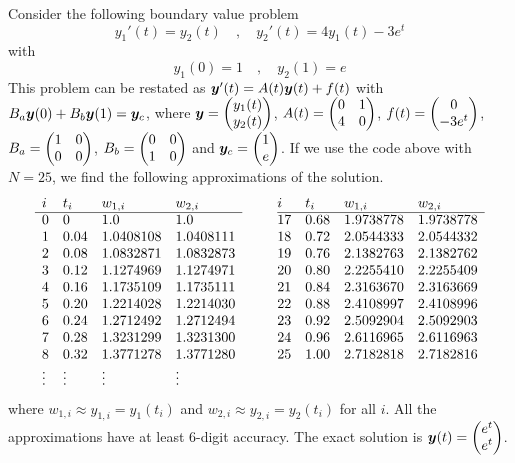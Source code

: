 \begin{egg}
Consider the following boundary value problem
\[
  y_1'(t) = y_2(t) \quad , \quad y_2'(t) = 4 y_1(t) - 3 e^t
\]
with
\[
y_1(0) = 1 \quad , \quad y_2(1) = e
\]
This problem can be restated as
$\bm{y}'(t) = A(t) \bm{y}(t) + f(t)$ with
$B_a \bm{y}(0) + B_b\bm{y}(1) = \bm{y}_c$, where
$\displaystyle \bm{y} = \begin{pmatrix} y_1(t) \\ y_2(t) \end{pmatrix}$,
$\displaystyle A(t) = \begin{pmatrix} 0 & 1 \\ 4 & 0 \end{pmatrix}$,
$\displaystyle f(t) = \begin{pmatrix} 0 \\ -3 e^t \end{pmatrix}$,
$\displaystyle B_a = \begin{pmatrix} 1 & 0 \\  0 & 0 \end{pmatrix}$,
$\displaystyle B_b = \begin{pmatrix} 0 & 0 \\ 1 & 0 \end{pmatrix}$
and $\displaystyle \bm{y}_c = \begin{pmatrix} 1 \\ e \end{pmatrix}$.
If we use the code above with $N=25$, we find the following approximations of
the solution.
\[
\begin{array}{llllc@{\hspace{2em}}llll}
i & t_i & w_{1,i} & w_{2,i} & & i & t_i & w_{1,i} & w_{2,i} \\
\cline{1-4} \cline{6-9}
0 & 0 & 1.0 & 1.0  & & 17 & 0.68 & 1.9738778 & 1.9738778 \\
1 & 0.04 & 1.0408108 & 1.0408111 & & 18 & 0.72 & 2.0544333 & 2.0544332 \\
2 & 0.08 & 1.0832871 & 1.0832873 & & 19 & 0.76 & 2.1382763 & 2.1382762 \\
3 & 0.12 & 1.1274969 & 1.1274971 & & 20 & 0.80 & 2.2255410 & 2.2255409 \\
4 & 0.16 & 1.1735109 & 1.1735111 & & 21 & 0.84 & 2.3163670 & 2.3163669 \\
5 & 0.20 & 1.2214028 & 1.2214030 & & 22 & 0.88 & 2.4108997 & 2.4108996 \\
6 & 0.24 & 1.2712492 & 1.2712494 & & 23 & 0.92 & 2.5092904 & 2.5092903 \\
7 & 0.28 & 1.3231299 & 1.3231300 & & 24 & 0.96 & 2.6116965 & 2.6116963 \\
8 & 0.32 & 1.3771278 & 1.3771280 & & 25 & 1.00 & 2.7182818 & 2.7182816 \\
\vdots & \vdots & \vdots & \vdots & & & & &
\end{array}
\]
where $w_{1,i} \approx y_{1,i} = y_1(t_i)$ and
$w_{2,i} \approx y_{2,i} = y_2(t_i)$ for all $i$.
All the approximations have at least $6$-digit accuracy.  The exact solution is
$\displaystyle \bm{y}(t) = \begin{pmatrix} e^t \\ e^t \end{pmatrix}$.


\end{egg}
